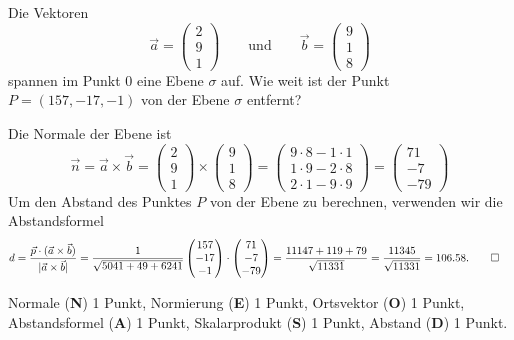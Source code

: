 Die Vektoren
\[
\vec a
=
\begin{pmatrix}2\\9\\1\end{pmatrix}
\qquad
\text{und}
\qquad
\vec b
=
\begin{pmatrix}9\\1\\8\end{pmatrix}
\]
spannen im Punkt $0$ eine Ebene $\sigma$ auf. Wie weit ist der Punkt
$P=(157,-17,-1)$ von der Ebene $\sigma$ entfernt?


\begin{loesung}
Die Normale der Ebene ist
\[
\vec n=
\vec a\times\vec b
=
\begin{pmatrix}2\\9\\1\end{pmatrix}
\times
\begin{pmatrix}9\\1\\8\end{pmatrix}
=
\begin{pmatrix}
9\cdot 8-1\cdot 1\\
1\cdot 9-2\cdot 8\\
2\cdot 1-9\cdot 9
\end{pmatrix}
=
\begin{pmatrix}
71\\-7\\-79
\end{pmatrix}
\]
Um den Abstand des Punktes $P$ von der Ebene zu berechnen, verwenden
wir die Abstandsformel
\begin{align*}
d&=\frac{\vec p\cdot (\vec a\times\vec b)}{|\vec a\times\vec b|}
=\frac1{\sqrt{5041+49+6241}}\begin{pmatrix}157\\-17\\-1\end{pmatrix}\cdot
\begin{pmatrix}
71\\-7\\-79
\end{pmatrix}
=\frac{11147+119+79}{\sqrt{11331}}=\frac{11345}{\sqrt{11331}}=106.58.
\qedhere
\end{align*}
\end{loesung}

\begin{bewertung}
Normale (\textbf{N}) 1 Punkt, Normierung (\textbf{E}) 1 Punkt, 
Ortsvektor (\textbf{O}) 1 Punkt,
Abstandsformel (\textbf{A}) 1 Punkt, Skalarprodukt (\textbf{S}) 1 Punkt,
Abstand (\textbf{D}) 1 Punkt.
\end{bewertung}

